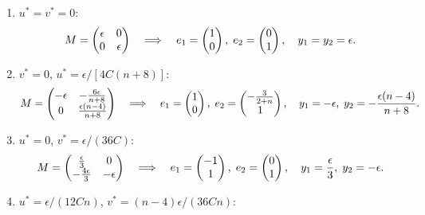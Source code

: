 \documentclass[11pt,letter, swedish, english
]{article}
\begin{document}
\begin{enumerate}[label=(\roman*)]
\item $u^*=v^*=0$: 
\[%
M= 
\begin{pmatrix}
\epsilon & 0 \\
0 & \epsilon
\end{pmatrix}
\quad\Longrightarrow\quad
e_1=\begin{pmatrix}
1\\0
\end{pmatrix},\;
e_2=\begin{pmatrix}
0\\1
\end{pmatrix}\qcomma
y_1=y_2=\epsilon.
\]%
\item $v^*=0$, $u^* = \epsilon/[4C(n+8)]$:
\[%
M=
\begin{pmatrix}
-\epsilon & -\frac{6\epsilon}{n+8}\\
0 & \frac{\epsilon(n-4)}{n+8}
\end{pmatrix}
\quad\Longrightarrow\quad
e_1=\begin{pmatrix}
1\\0
\end{pmatrix},\;
e_2=\begin{pmatrix}
-\frac{3}{2+n}\\1
\end{pmatrix}\qcomma
y_1=-\epsilon,\;y_2=-\frac{\epsilon(n-4)}{n+8}.
\]%
\item $u^*=0$, $v^* = \epsilon/(36C)$:
\[%
M=
\begin{pmatrix}
\frac{\epsilon}{3}   & 0 \\
-\frac{4\epsilon}{3} & -\epsilon
\end{pmatrix}
\quad\Longrightarrow\quad
e_1=\begin{pmatrix}
-1\\1
\end{pmatrix},\;
e_2=\begin{pmatrix}
0\\1
\end{pmatrix}\qcomma
y_1=\frac{\epsilon}{3},\;y_2=-\epsilon.
\]%
\item $u^* = \epsilon/(12Cn)$, $v^* = (n-4)\epsilon/(36Cn)$:
\[%
\begin{aligned}

\end{aligned}\]
\end{enumerate}
\end{document}
